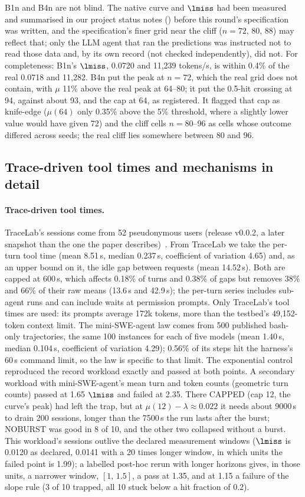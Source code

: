 B1n and B4n are not blind. The native curve and $\lmiss$ had been measured and summarised in our project status notes () before this round's specification was written, and the specification's finer grid near the cliff ($n=72$, 80, 88) may reflect that; only the LLM agent that ran the predictions was instructed not to read those data and, by its own record (not checked independently), did not. For completeness: B1n's $\lmiss$, 0.0720\sps{} and 11,239 tokens/s, is within 0.4\% of the real 0.0718 and 11,282. B4n put the peak at $n=72$, which the real grid does not contain, with $\mu$ 11\% above the real peak at 64--80; it put the 0.5-hit crossing at 94, against about 93, and the cap at 64, as registered. It flagged that cap as knife-edge ($\mu(64)$ only 0.35\% above the 5\% threshold, where a slightly lower value would have given 72) and the cliff cells $n=80$--96 as cells whose outcome differed across seeds; the real cliff lies somewhere between 80 and 96.

\subsection{Trace-driven tool times and mechanisms in detail}
\paragraph{Trace-driven tool times.} TraceLab's sessions come from 52 pseudonymous users (release v0.0.2, a later snapshot than the one the paper describes)~\citep{zhu2026tracelab}. From TraceLab we take the per-turn tool time (mean 8.51\,s, median 0.237\,s, coefficient of variation 4.65) and, as an upper bound on it, the idle gap between requests (mean 14.52\,s). Both are capped at 600\,s, which affects 0.18\% of turns and 0.38\% of gaps but removes 38\% and 66\% of their raw means (13.6\,s and 42.9\,s); the per-turn series includes sub-agent runs and can include waits at permission prompts. Only TraceLab's tool times are used: its prompts average 172k tokens, more than the testbed's 49,152-token context limit. The mini-SWE-agent law comes from 500 published bash-only trajectories, the same 100 instances for each of five models (mean 1.40\,s, median 0.104\,s, coefficient of variation 4.29); 0.56\% of its steps hit the harness's 60\,s command limit, so the law is specific to that limit. The exponential control reproduced the record workload exactly and passed at both points. A secondary workload with mini-SWE-agent's mean turn and token counts (geometric turn counts) passed at 1.65 $\lmiss$ and failed at 2.35. There CAPPED (cap 12, the curve's peak) had left the trap, but at $\mu(12)-\lambda\approx0.022$\sps{} it needs about 9000\,s to drain 200 sessions, longer than the 7500\,s the run lasts after the burst; NOBURST was good in 8 of 10, and the other two collapsed without a burst. This workload's sessions outlive the declared measurement windows ($\lmiss$ is 0.0120\sps{} as declared, 0.0141 with a 20 times longer window, in which units the failed point is 1.99); a labelled post-hoc rerun with longer horizons gives, in those units, a narrower window, $[1,\,1.5]$, a pass at 1.35, and at 1.15 a failure of the slope rule (3 of 10 trapped, all 10 stuck below a hit fraction of 0.2).

